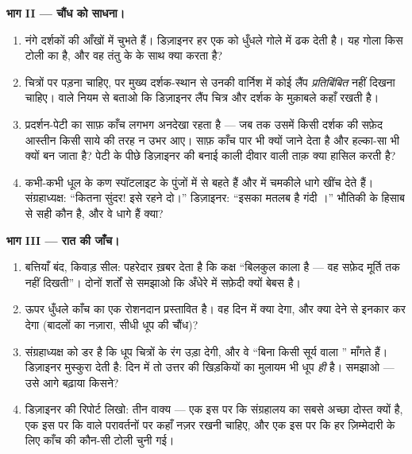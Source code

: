 \begin{problem}
\medskip\noindent\textbf{भाग II --- चौंध को साधना।}
\begin{enumerate}[resume]
  \item नंगे  दर्शकों की आँखों में चुभते हैं। डिज़ाइनर हर एक को
        धुँधले गोले में ढक देती है। यह गोला किस टोली का है, और वह
        तंतु के  के साथ क्या करता है?
  \item चित्रों पर  पड़ना चाहिए, पर मुख्य दर्शक-स्थान से उनकी
        वार्निश में कोई लैंप \emph{प्रतिबिंबित} नहीं दिखना चाहिए।
         वाले नियम से बताओ कि डिज़ाइनर लैंप चित्र और दर्शक के
        मुक़ाबले कहाँ रखती है।
  \item प्रदर्शन-पेटी का साफ़ काँच लगभग अनदेखा रहता है --- जब तक उसमें
        किसी दर्शक की सफ़ेद आस्तीन किसी साये की तरह न उभर आए। साफ़
        काँच पार भी क्यों जाने देता है और हल्का-सा  भी क्यों बन
        जाता है? पेटी के पीछे डिज़ाइनर की बनाई काली दीवार वाली ताक़
        क्या हासिल करती है?
  \item कभी-कभी धूल के कण स्पॉटलाइट के पुंजों में से बहते हैं और 
        में चमकीले धागे खींच देते हैं। संग्रहाध्यक्ष: ``कितना सुंदर!
        इसे रहने दो।'' डिज़ाइनर: ``इसका मतलब है गंदी ।'' भौतिकी के
        हिसाब से सही कौन है, और वे धागे हैं क्या?
\end{enumerate}

\medskip\noindent\textbf{भाग III --- रात की जाँच।}
\begin{enumerate}[resume]
  \item बत्तियाँ बंद, किवाड़ सील: पहरेदार ख़बर देता है कि कक्ष
        ``बिलकुल काला है --- वह सफ़ेद मूर्ति तक नहीं दिखती''। दोनों
        शर्तों से समझाओ कि अँधेरे में सफ़ेदी क्यों बेबस है।
  \item ऊपर धुँधले काँच का एक रोशनदान प्रस्तावित है। वह दिन में क्या
        देगा, और क्या देने से इनकार कर देगा (बादलों का नज़ारा, सीधी
        धूप की चौंध)?
  \item संग्रहाध्यक्ष को डर है कि धूप चित्रों के रंग उड़ा देगी, और वे
        ``बिना किसी सूर्य वाला '' माँगते हैं। डिज़ाइनर मुस्कुरा
        देती है: दिन में तो उत्तर की खिड़कियों का मुलायम  भी
        धूप \emph{ही} है। समझाओ --- उसे आगे बढ़ाया किसने?
  \item डिज़ाइनर की रिपोर्ट लिखो: तीन वाक्य --- एक इस पर कि 
        संग्रहालय का सबसे अच्छा दोस्त क्यों है, एक इस पर कि 
        वाले परावर्तनों पर कहाँ नज़र रखनी चाहिए, और एक इस पर कि हर
        ज़िम्मेदारी के लिए काँच की कौन-सी टोली चुनी गई।
\end{enumerate}
\end{problem}
